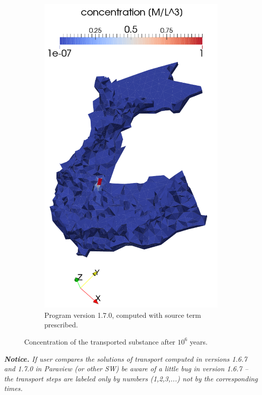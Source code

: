 \begin{figure}[!h]
\begin{subfigure}[b]{0.3\textwidth}
        \includegraphics[width=\textwidth]{tests_graphics/mel_long_end_170.pdf}
        \caption{Program version 1.7.0, computed with source term prescribed.}
        \label{fig:bench_mel4c}
    \end{subfigure}
    \caption{Concentration of the transported substance after $10^6$ years.}
    \label{fig:bench_mel4}
\end{figure}


\emph{\textbf{Notice.} If user compares the solutions of transport computed in versions 1.6.7 and 1.7.0 in Paraview (or other SW)
be aware of a little bug in version 1.6.7 -- the transport steps are labeled only by numbers (1,2,3,...) not by the 
corresponding times. }

